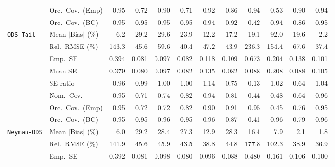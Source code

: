 \begin{landscape}
\begin{longtable}{llrrrrrrrrrr}
 & Orc.\ Cov.\ (Emp) & \cellcolor{rankone}0.95 & 0.72 & 0.90 & 0.71 & \cellcolor{rankthree}0.92 & 0.86 & \cellcolor{ranktwo}0.94 & 0.53 & 0.90 & \cellcolor{ranktwo}0.94 \\
 & Orc.\ Cov.\ (BC) & \cellcolor{rankone}0.95 & \cellcolor{rankone}0.95 & \cellcolor{rankone}0.95 & \cellcolor{rankone}0.95 & \cellcolor{ranktwo}0.94 & \cellcolor{rankthree}0.92 & 0.42 & \cellcolor{ranktwo}0.94 & 0.86 & \cellcolor{rankone}0.95 \\
\addlinespace[2pt]
\quad \texttt{ODS-Tail} & Mean $|$Bias$|$ (\%) & \cellcolor{ranktwo}6.2 & 29.2 & 29.6 & 23.9 & \cellcolor{rankthree}12.2 & 17.2 & 19.1 & 92.0 & 19.6 & \cellcolor{rankone}2.2 \\
 & Rel.\ RMSE (\%) & 143.3 & 45.6 & 59.6 & \cellcolor{ranktwo}40.4 & 47.2 & \cellcolor{rankthree}43.9 & 236.3 & 154.4 & 67.6 & \cellcolor{rankone}37.4 \\
 & Emp.\ SE & 0.394 & 0.081 & 0.097 & 0.082 & 0.118 & 0.109 & 0.673 & 0.204 & 0.138 & 0.101 \\
 & Mean SE & 0.379 & 0.080 & 0.097 & 0.082 & 0.135 & 0.082 & 0.088 & 0.208 & 0.088 & 0.105 \\
 & SE ratio & 0.96 & \cellcolor{ranktwo}0.99 & \cellcolor{rankone}1.00 & \cellcolor{rankone}1.00 & 1.14 & 0.75 & 0.13 & \cellcolor{rankthree}1.02 & 0.64 & 1.04 \\
 & Nom.\ Cov. & \cellcolor{rankone}0.95 & 0.71 & 0.74 & \cellcolor{rankthree}0.82 & \cellcolor{ranktwo}0.94 & 0.81 & 0.44 & 0.48 & 0.64 & \cellcolor{ranktwo}0.96 \\
 & Orc.\ Cov.\ (Emp) & \cellcolor{rankone}0.95 & 0.72 & 0.72 & 0.82 & \cellcolor{rankthree}0.90 & \cellcolor{ranktwo}0.91 & \cellcolor{rankone}0.95 & 0.45 & 0.76 & \cellcolor{rankone}0.95 \\
 & Orc.\ Cov.\ (BC) & \cellcolor{rankone}0.95 & \cellcolor{rankone}0.95 & \cellcolor{ranktwo}0.96 & \cellcolor{rankone}0.95 & \cellcolor{ranktwo}0.96 & \cellcolor{rankthree}0.87 & 0.41 & \cellcolor{ranktwo}0.96 & 0.79 & \cellcolor{ranktwo}0.96 \\
\addlinespace[2pt]
\quad \texttt{Neyman-ODS} & Mean $|$Bias$|$ (\%) & \cellcolor{rankthree}6.0 & 29.2 & 28.4 & 27.3 & 12.9 & 28.3 & 16.4 & 7.9 & \cellcolor{ranktwo}2.1 & \cellcolor{rankone}1.8 \\
 & Rel.\ RMSE (\%) & 141.9 & 45.6 & 45.9 & 43.5 & \cellcolor{ranktwo}38.8 & 44.8 & 177.8 & 102.3 & \cellcolor{rankthree}38.9 & \cellcolor{rankone}36.9 \\
 & Emp.\ SE & 0.392 & 0.081 & 0.098 & 0.080 & 0.096 & 0.088 & 0.480 & 0.161 & 0.106 & 0.100 \\

\end{longtable}
\end{landscape}
